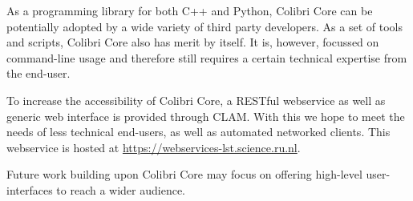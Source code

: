 \documentclass[a4paper,12pt]{article}
\begin{document}
As a programming library for both C++ and Python, Colibri Core can be
potentially adopted by a wide variety of third party developers. As a set of
tools and scripts, Colibri Core also has merit by itself. It is, however,
focussed on command-line usage and therefore still requires a certain technical
expertise from the end-user.

To increase the accessibility of Colibri Core, a RESTful webservice as well as
generic web interface is provided through CLAM\cite{CLAMPAPER}. With this we
hope to meet the needs of less technical end-users, as well as automated
networked clients. This webservice is hosted at
\url{https://webservices-lst.science.ru.nl}.

Future work building upon Colibri Core may focus on offering 
high-level user-interfaces to reach a wider audience.




\end{document}
